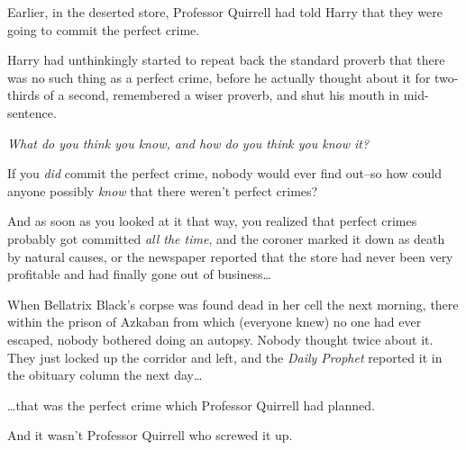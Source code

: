 \later

Earlier, in the deserted store, Professor Quirrell had told Harry that they were going to commit the perfect crime.

Harry had unthinkingly started to repeat back the standard proverb that there was no such thing as a perfect crime, before he actually thought about it for two-thirds of a second, remembered a wiser proverb, and shut his mouth in mid-sentence.

\emph{What do you think you know, and how do you think you know it?}

If you \emph{did} commit the perfect crime, nobody would ever find out\---so how could anyone possibly \emph{know} that there weren't perfect crimes?

And as soon as you looked at it that way, you realized that perfect crimes probably got committed \emph{all the time}, and the coroner marked it down as death by natural causes, or the newspaper reported that the store had never been very profitable and had finally gone out of business{\ldots}

When Bellatrix Black's corpse was found dead in her cell the next morning, there within the prison of Azkaban from which (everyone knew) no one had ever escaped, nobody bothered doing an autopsy. Nobody thought twice about it. They just locked up the corridor and left, and the \emph{Daily Prophet} reported it in the obituary column the next day{\ldots}

{\ldots}that was the perfect crime which Professor Quirrell had planned.

And it wasn't Professor Quirrell who screwed it up.
